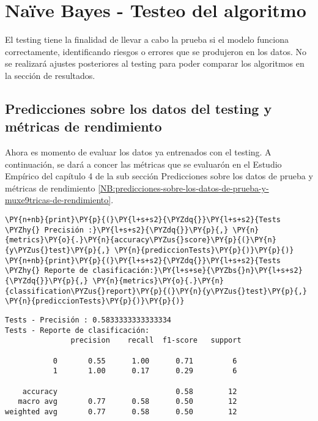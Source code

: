     \hypertarget{nauxefve-bayes---testeo-del-algoritmo}{%
\section{Naïve Bayes - Testeo del algoritmo}\label{nauxefve-bayes---testeo-del-algoritmo}}

	El testing tiene la finalidad de llevar a cabo la prueba si el modelo funciona correctamente, identificando riesgos o errores que se produjeron en los datos. No se realizará ajustes posteriores al testing para poder
comparar los algoritmos en la sección de resultados.

    \hypertarget{predicciones-sobre-los-datos-del-testing-y-muxe9tricas-de-rendimiento}{%
\subsection{Predicciones sobre los datos del testing y métricas de rendimiento}\label{NBT:predicciones-sobre-los-datos-del-testing-y-muxe9tricas-de-rendimiento}}

	Ahora es momento de evaluar los datos ya entrenados con el testing. A continuación, se dará a concer las métricas que se evaluarón en el Estudio Empírico del capítulo 4  de la sub sección Predicciones sobre los datos de prueba y métricas de rendimiento \ref{NB:predicciones-sobre-los-datos-de-prueba-y-muxe9tricas-de-rendimiento}.

    \begin{tcolorbox}[breakable, size=fbox, boxrule=1pt, pad at break*=1mm,colback=cellbackground, colframe=cellborder]
\begin{Verbatim}[commandchars=\\\{\}]
\PY{n+nb}{print}\PY{p}{(}\PY{l+s+s2}{\PYZdq{}}\PY{l+s+s2}{Tests \PYZhy{} Precisión :}\PY{l+s+s2}{\PYZdq{}}\PY{p}{,} \PY{n}{metrics}\PY{o}{.}\PY{n}{accuracy\PYZus{}score}\PY{p}{(}\PY{n}{y\PYZus{}test}\PY{p}{,} \PY{n}{prediccionTests}\PY{p}{)}\PY{p}{)}
\PY{n+nb}{print}\PY{p}{(}\PY{l+s+s2}{\PYZdq{}}\PY{l+s+s2}{Tests \PYZhy{} Reporte de clasificación:}\PY{l+s+se}{\PYZbs{}n}\PY{l+s+s2}{\PYZdq{}}\PY{p}{,} \PY{n}{metrics}\PY{o}{.}\PY{n}{classification\PYZus{}report}\PY{p}{(}\PY{n}{y\PYZus{}test}\PY{p}{,} \PY{n}{prediccionTests}\PY{p}{)}\PY{p}{)}
\end{Verbatim}
\end{tcolorbox}

    \begin{Verbatim}[commandchars=\\\{\}]
Tests - Precisión : 0.5833333333333334
Tests - Reporte de clasificación:
               precision    recall  f1-score   support

           0       0.55      1.00      0.71         6
           1       1.00      0.17      0.29         6

    accuracy                           0.58        12
   macro avg       0.77      0.58      0.50        12
weighted avg       0.77      0.58      0.50        12

    \end{Verbatim}

